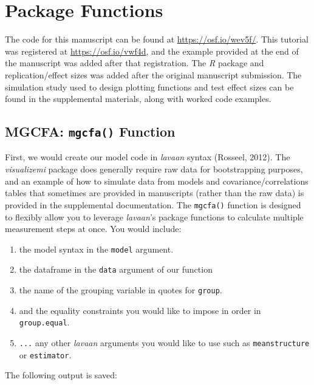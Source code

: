 \documentclass[
  man]{apa7}
\providecommand{\tightlist}{%
  \setlength{\itemsep}{0pt}\setlength{\parskip}{0pt}}
\begin{document}
\section{Package Functions}\label{package-functions}

The code for this manuscript can be found at \url{https://osf.io/wev5f/}. This tutorial was registered at \url{https://osf.io/vwf4d}, and the example provided at the end of the manuscript was added after that registration. The \emph{R} package and replication/effect sizes was added after the original manuscript submission. The simulation study used to design plotting functions and test effect sizes can be found in the supplemental materials, along with worked code examples.

\subsection{\texorpdfstring{MGCFA: \texttt{mgcfa()} Function}{MGCFA: mgcfa() Function}}\label{mgcfa-mgcfa-function}

First, we would create our model code in \emph{lavaan} syntax (Rosseel, 2012). The \emph{visualizemi} package does generally require raw data for bootstrapping purposes, and an example of how to simulate data from models and covariance/correlations tables that sometimes are provided in manuscripts (rather than the raw data) is provided in the supplemental documentation. The \texttt{mgcfa()} function is designed to flexibly allow you to leverage \emph{lavaan}'s package functions to calculate multiple measurement steps at once. You would include:

\begin{enumerate}
\def\labelenumi{\arabic{enumi})}
\tightlist
\item
  the model syntax in the \texttt{model} argument.
\item
  the dataframe in the \texttt{data} argument of our function
\item
  the name of the grouping variable in quotes for \texttt{group}.
\item
  and the equality constraints you would like to impose in order in \texttt{group.equal}.
\item
  \texttt{...} any other \emph{lavaan} arguments you would like to use such as \texttt{meanstructure} or \texttt{estimator}.
\end{enumerate}

The following output is saved:
\end{document}
